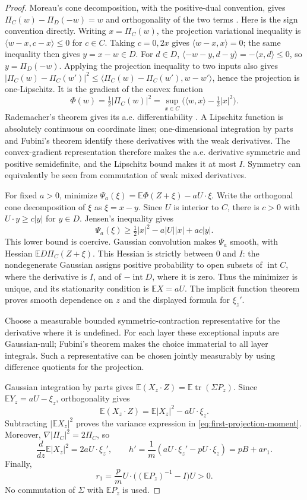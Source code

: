 \begin{proof}
Moreau's cone decomposition, with the positive-dual convention, gives $\Pi_C(w)-\Pi_D(-w)=w$ and orthogonality of the two terms \cite{Moreau1962,Soltan2019}. Here is the sign convention directly. Writing $x=\Pi_C(w)$, the projection variational inequality is $\langle w-x,c-x\rangle\le0$ for $c\in C$. Taking $c=0,2x$ gives $\langle w-x,x\rangle=0$; the same inequality then gives $y=x-w\in D$. For $d\in D$, $\langle-w-y,d-y\rangle=-\langle x,d\rangle\le0$, so $y=\Pi_D(-w)$. Applying the projection inequality to two inputs also gives $|\Pi_C(w)-\Pi_C(w')|^2\le\langle\Pi_C(w)-\Pi_C(w'),w-w'\rangle$, hence the projection is one-Lipschitz. It is the gradient of the convex function
\[
\Phi(w)=\tfrac12|\Pi_C(w)|^2
=\sup_{x\in C}\bigl(\langle w,x\rangle-\tfrac12|x|^2\bigr).
\]
Rademacher's theorem gives its a.e. differentiability \cite{Rademacher1919,NekvindaZajicek1988}. A Lipschitz function is absolutely continuous on coordinate lines; one-dimensional integration by parts and Fubini's theorem identify these derivatives with the weak derivatives. The convex-gradient representation therefore makes the a.e. derivative symmetric and positive semidefinite, and the Lipschitz bound makes it at most $I$. Symmetry can equivalently be seen from commutation of weak mixed derivatives.

For fixed $a>0$, minimize $\Psi_a(\xi)=\mathbb{E}\Phi(Z+\xi)-aU\cdot\xi$. Write the orthogonal cone decomposition of $\xi$ as $\xi=x-y$. Since $U$ is interior to $C$, there is $c>0$ with $U\cdot y\ge c|y|$ for $y\in D$. Jensen's inequality gives
\[
\Psi_a(\xi)\ge\tfrac12|x|^2-a|U||x|+ac|y|.
\]
This lower bound is coercive. Gaussian convolution makes $\Psi_a$ smooth, with Hessian $\mathbb{E} D\Pi_C(Z+\xi)$. This Hessian is strictly between $0$ and $I$: the nondegenerate Gaussian assigns positive probability to open subsets of $\operatorname{int}C$, where the derivative is $I$, and of $-\operatorname{int}D$, where it is zero. Thus the minimizer is unique, and its stationarity condition is $\mathbb{E}X=aU$. The implicit function theorem proves smooth dependence on $z$ and the displayed formula for $\xi_z'$.

Choose a measurable bounded symmetric-contraction representative for the derivative where it is undefined. For each layer these exceptional inputs are Gaussian-null; Fubini's theorem makes the choice immaterial to all layer integrals. Such a representative can be chosen jointly measurably by using difference quotients for the projection.

Gaussian integration by parts gives $\mathbb{E}(X_z\cdot Z)=\mathbb{E}\operatorname{tr}(\Sigma P_z)$. Since $\mathbb{E}Y_z=aU-\xi_z$, orthogonality gives
\[
\mathbb{E}(X_z\cdot Z)=\mathbb{E}|X_z|^2-aU\cdot\xi_z.
\]
Subtracting $|\mathbb{E}X_z|^2$ proves the variance expression in \eqref{eq:first-projection-moment}. Moreover, $\nabla|\Pi_C|^2=2\Pi_C$, so
\[
\frac d{dz}\mathbb{E}|X_z|^2=2aU\cdot\xi_z',\qquad
h'=\frac1m(aU\cdot\xi_z'-pU\cdot\xi_z)=pB+ar_1.
\]
Finally,
\[
r_1=\frac p m U\cdot\bigl((\mathbb{E}P_z)^{-1}-I\bigr)U>0.
\]
No commutation of $\Sigma$ with $\mathbb{E}P_z$ is used.
\end{proof}

